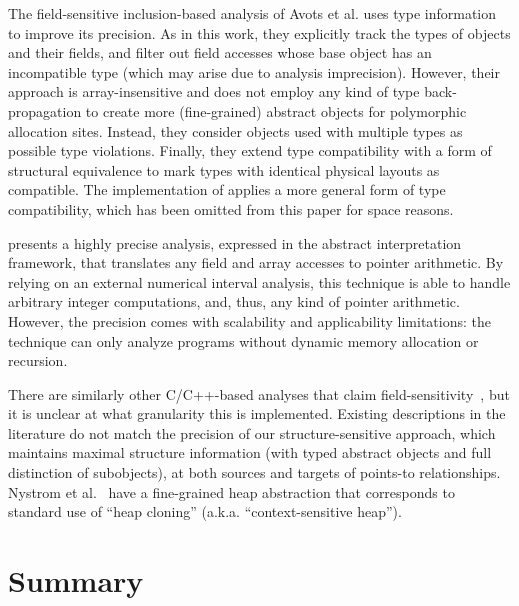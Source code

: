The field-sensitive inclusion-based analysis of Avots et
al. \cite{icse/AvotsDLL05} uses type information to improve its
precision. As in this work, they explicitly track the types of objects
and their fields, and filter out field accesses whose base object has
an incompatible type (which may arise due to analysis
imprecision). However, their approach is array-insensitive and does
not employ any kind of type back-propagation to create more
(fine-grained) abstract objects for polymorphic allocation
sites. Instead, they consider objects used with multiple types as
possible type violations. Finally, they extend type compatibility with
a form of structural equivalence to mark types with identical
physical layouts as compatible. The implementation of \cclyzer{} 
applies a more general form of type compatibility, which has
been omitted from this paper for space reasons.

\citeauthor{lctrts/Mine06} \cite{lctrts/Mine06} presents a highly
precise analysis, expressed in the abstract interpretation framework,
that translates any field and array accesses to pointer arithmetic. By
relying on an external numerical interval analysis, this technique is
able to handle arbitrary integer computations, and, thus, any kind of
pointer arithmetic. However, the precision comes with scalability and
applicability limitations: the technique can only analyze programs
without dynamic memory allocation or recursion.

There are similarly other C/C++-based analyses that claim
field-sensitivity~\cite{popl/HardekopfL09,cgo/HardekopfL11}, but it is
unclear at what granularity this is implemented. Existing descriptions
in the literature do not match the precision of our
structure-sensitive approach, which maintains maximal structure
information (with typed abstract objects and full distinction of subobjects), at
both sources and targets of points-to relationships. Nystrom et
al.~\cite{paste/NystromKH04} have a fine-grained heap abstraction that
corresponds to standard use of ``heap cloning''
(a.k.a. ``context-sensitive heap'').%


\section{Summary}

